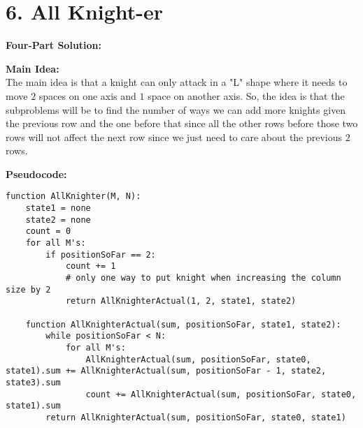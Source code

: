 \documentclass[11pt]{article}
\newenvironment{FourPartSolution}{\par{\bf Four-Part Solution:}}{\smallskip}
\newenvironment{mainIdea}{\par{\bf Main Idea:}}{\smallskip}
\newenvironment{pseudocode}{\par{\bf Pseudocode:}}{\smallskip}
\begin{document}
\section*{6. All Knight-er}
\begin{FourPartSolution}
\\
\begin{mainIdea}
\\
The main idea is that a knight can only attack in a "L" shape where it needs to move $2$ spaces on one axis and $1$ space on another axis. So, the idea is that the subproblems will be to find the number of ways we can add more knights given the previous row and the one before that since all the other rows before those two rows will not affect the next row since we just need to care about the previous $2$ rows.
\end{mainIdea}
\\
\begin{pseudocode}
\begin{lstlisting}
function AllKnighter(M, N):
	state1 = none
	state2 = none
	count = 0
	for all M's:
		if positionSoFar == 2:
			count += 1
			# only one way to put knight when increasing the column size by 2
			return AllKnighterActual(1, 2, state1, state2)

	function AllKnighterActual(sum, positionSoFar, state1, state2):
		while positionSoFar < N:
			for all M's:
				AllKnighterActual(sum, positionSoFar, state0, state1).sum += AllKnighterActual(sum, positionSoFar - 1, state2, state3).sum
				count += AllKnighterActual(sum, positionSoFar, state0, state1).sum
		return AllKnighterActual(sum, positionSoFar, state0, state1)


\end{lstlisting}
\end{pseudocode}
\end{FourPartSolution}
\end{document}
